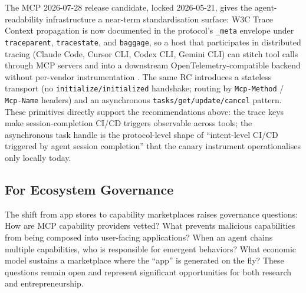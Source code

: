 \documentclass[12pt]{article}
\begin{document}
The MCP 2026-07-28 release candidate, locked 2026-05-21, gives the agent-readability infrastructure a near-term standardisation surface: W3C Trace Context propagation is now documented in the protocol's \texttt{\_meta} envelope under \texttt{traceparent}, \texttt{tracestate}, and \texttt{baggage}, so a host that participates in distributed tracing (Claude Code, Cursor CLI, Codex CLI, Gemini CLI) can stitch tool calls through MCP servers and into a downstream OpenTelemetry-compatible backend without per-vendor instrumentation \citep{mcp2026rc}. The same RC introduces a stateless transport (no \texttt{initialize/initialized} handshake; routing by \texttt{Mcp-Method} / \texttt{Mcp-Name} headers) and an asynchronous \texttt{tasks/get/update/cancel} pattern. These primitives directly support the recommendations above: the trace keys make session-completion CI/CD triggers observable across tools; the asynchronous task handle is the protocol-level shape of ``intent-level CI/CD triggered by agent session completion'' that the canary instrument operationalises only locally today.

\subsection{For Ecosystem Governance}

The shift from app stores to capability marketplaces raises governance questions: How are MCP capability providers vetted? What prevents malicious capabilities from being composed into user-facing applications? When an agent chains multiple capabilities, who is responsible for emergent behaviors? What economic model sustains a marketplace where the ``app'' is generated on the fly? These questions remain open and represent significant opportunities for both research and entrepreneurship.
\end{document}
